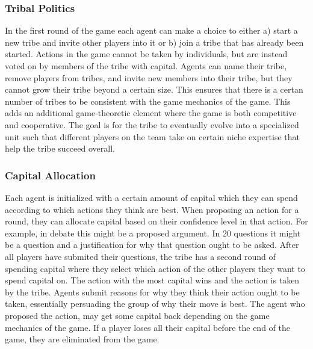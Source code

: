 
\subsubsection{Tribal Politics}
In the first round of the game each agent can make a choice to either a) start a new tribe and invite other players into it or b) join a tribe that has already been started. Actions in the game cannot be taken by individuals, but are instead voted on by members of the tribe with capital. Agents can name their tribe, remove players from tribes, and invite new members into their tribe, but they cannot grow their tribe beyond a certain size. This ensures that there is a certan number of tribes to be consistent with the game mechanics of the game. This adds an additional game-theoretic element where the game is both competitive and cooperative. The goal is for the tribe to eventually evolve into a specialized unit such that different players on the team take on certain niche expertise that help the tribe succeed overall.

\subsubsection{Capital Allocation}
Each agent is initialized with a certain amount of capital which they can spend according to which actions they think are best. When proposing an action for a round, they can allocate capital based on their confidence level in that action. For example, in debate this might be a proposed argument. In 20 questions it might be a question and a justification for why that question ought to be asked. After all players have submited their questions, the tribe has a second round of spending capital where they select which action of the other players they want to spend capital on. The action with the most capital wins and the action is taken by the tribe. Agents submit reasons for why they think their action ought to be taken, essentially persuading the group of why their move is best. The agent who proposed the action, may get some capital back depending on the game mechanics of the game. If a player loses all their capital before the end of the game, they are eliminated from the game.


